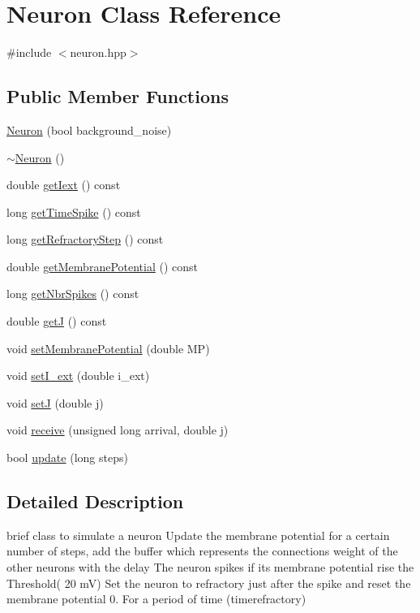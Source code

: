 \hypertarget{classNeuron}{\section{Neuron Class Reference}
\label{classNeuron}
}


{\ttfamily \#include $<$neuron.\-hpp$>$}

\subsection*{Public Member Functions}
\begin{DoxyCompactItemize}
\item 
\hyperlink{classNeuron_a85d8f267cc8abf427c3efdcda918be07}{Neuron} (bool background\-\_\-noise)
\item 
\hyperlink{classNeuron_a94a250ce7e167760e593979b899745b1}{$\sim$\-Neuron} ()
\item 
double \hyperlink{classNeuron_a8697b23d6eb0c303fdd88e4dd5cec304}{get\-Iext} () const 
\item 
long \hyperlink{classNeuron_a25d3e7ca2abd87c687dd210ad9ae1ef0}{get\-Time\-Spike} () const 
\item 
long \hyperlink{classNeuron_aa432ad1360adc1857f5855b01202654e}{get\-Refractory\-Step} () const 
\item 
double \hyperlink{classNeuron_a86341dee7a81765fe4840777a008c688}{get\-Membrane\-Potential} () const 
\item 
long \hyperlink{classNeuron_afbbc9c12fb5cb36a85e9f276da72ecaa}{get\-Nbr\-Spikes} () const 
\item 
double \hyperlink{classNeuron_a320ab48e220523371b266385c650e31f}{get\-J} () const 
\item 
void \hyperlink{classNeuron_acc5c70e280d6dac451a5c90934ab6ade}{set\-Membrane\-Potential} (double M\-P)
\item 
void \hyperlink{classNeuron_a9757cf90c49f7dca921876adead9ec93}{set\-I\-\_\-ext} (double i\-\_\-ext)
\item 
void \hyperlink{classNeuron_a475ad67c35d19e414abff5e973ef93f1}{set\-J} (double j)
\item 
void \hyperlink{classNeuron_a81f40d4cbd981c90e49577163b72c1bb}{receive} (unsigned long arrival, double j)
\item 
bool \hyperlink{classNeuron_aaf7b3fab1f9f230813b0bd8043dee21c}{update} (long steps)
\end{DoxyCompactItemize}


\subsection{Detailed Description}
brief class to simulate a neuron Update the membrane potential for a certain number of steps, add the buffer which represents the connections weight of the other neurons with the delay The neuron spikes if its membrane potential rise the Threshold( 20 m\-V) Set the neuron to refractory just after the spike and reset the membrane potential 0. For a period of time (timerefractory) 

